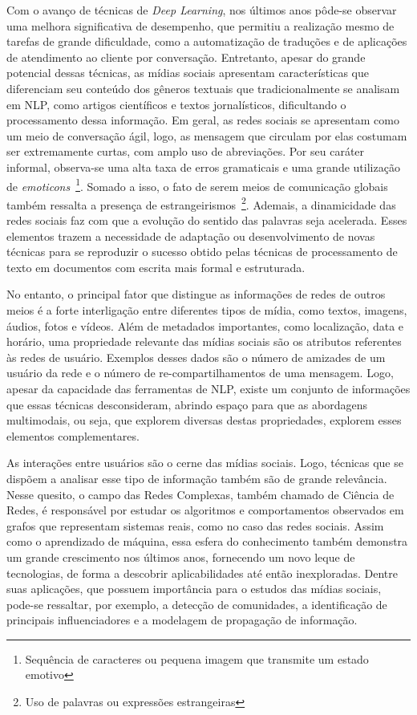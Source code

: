 Com o avanço de técnicas de \textit{Deep Learning}, nos últimos anos pôde-se
observar uma melhora significativa de desempenho, que permitiu a realização mesmo
de tarefas de grande dificuldade, como a automatização de traduções e de aplicações
de atendimento ao cliente por conversação.
Entretanto, apesar do grande potencial dessas técnicas, as mídias sociais
apresentam características que diferenciam seu conteúdo dos gêneros textuais que
tradicionalmente se analisam em NLP, como artigos científicos e textos
jornalísticos, dificultando o processamento dessa informação.
Em geral, as redes sociais se apresentam como um meio de conversação ágil, logo,
as mensagem que circulam por elas costumam ser extremamente curtas, com amplo
uso de abreviações.
Por seu caráter informal, observa-se uma alta taxa de erros gramaticais e
uma grande utilização de \textit{emoticons}~\footnote{Sequência de caracteres ou
pequena imagem que transmite um estado emotivo}.
Somado a isso, o fato de serem meios de comunicação globais também ressalta a
presença de estrangeirismos~\footnote{Uso de palavras ou expressões estrangeiras}.
Ademais, a dinamicidade das redes sociais faz com que a evolução do sentido das
palavras seja acelerada.
Esses elementos trazem a necessidade de adaptação ou desenvolvimento de novas
técnicas para se reproduzir o sucesso obtido pelas técnicas de processamento de
texto em documentos com escrita mais formal e estruturada.

No entanto, o principal fator que distingue as informações de redes de outros
meios é a forte interligação entre diferentes tipos de mídia, como textos, imagens,
áudios, fotos e vídeos.
Além de metadados importantes, como localização, data e horário, uma propriedade
relevante das mídias sociais são os atributos referentes às redes de usuário.
Exemplos desses dados são o número de amizades de um usuário da rede e o
número de re-compartilhamentos de uma mensagem.
Logo, apesar da capacidade das ferramentas de NLP, existe um conjunto de
informações que essas técnicas desconsideram, abrindo espaço para que as
abordagens multimodais, ou seja, que explorem diversas destas propriedades,
explorem esses elementos complementares.

As interações entre usuários são o cerne das mídias sociais.
Logo, técnicas que se dispõem a analisar esse tipo de informação também são de
grande relevância.
Nesse quesito, o campo das Redes Complexas, também chamado de Ciência de Redes,
é responsável por estudar os algoritmos e comportamentos observados em grafos
que representam sistemas reais, como no caso das redes sociais.
Assim como o aprendizado de máquina, essa esfera do conhecimento também
demonstra um grande crescimento nos últimos anos, fornecendo um novo leque de
tecnologias, de forma a descobrir aplicabilidades até então inexploradas.
Dentre suas aplicações, que possuem importância para o estudos das mídias
sociais, pode-se ressaltar, por exemplo, a detecção de comunidades, a
identificação de principais influenciadores e a modelagem de propagação de
informação.

